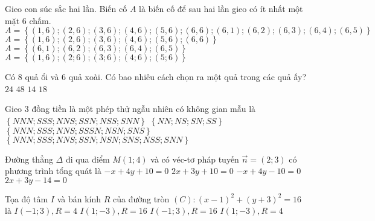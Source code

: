 \begin{ex}%
	Gieo con súc sắc hai lần. Biến cố $A$ là biến cố để sau hai lần gieo có ít nhất một mặt $6$ chấm.
	\choice
	{\True $A=\left\{(1,6);(2,6);(3,6);(4,6);(5,6);(6,6);(6,1);(6,2);(6,3);(6,4);(6,5)\right\}$}
	{$A=\left\{(1,6);(2,6);(3,6);(4,6);(5,6);(6,6)\right\}$}
	{$A=\left\{(6,1);(6,2);(6,3);(6,4);(6,5)\right\}$}
	{$A=\left\{(1,6);(2;6);(3;6);(4;6);(5;6)\right\}$}
\end{ex}

\begin{ex}%
	Có $8$ quả ổi và $6$ quả xoài. Có bao nhiêu cách chọn ra một quả trong các quả ấy?
	\choice
	{$24$}
	{$48$}
	{\True $14$}
	{$18$}
\end{ex}

\begin{ex}%
	Gieo $3$ đồng tiền là một phép thử ngẫu nhiên có không gian mẫu là
	\choice
	{$\left\{NNN; SSS; NNS; SSN; NSS; SNN\right\}$}
	{$\left\{NN; NS ; SN; SS\right\}$}
	{$\left\{NNN; SSS; NNS ;SSSN ;NSN; SNS\right\}$}
	{\True $\left\{NNN; SSS; NNS; SSN; NSN; SNS; NSS; SNN \right\}$}
\end{ex}

\begin{ex}%
	Đường thẳng $\Delta$ đi qua điểm $M(1;4)$ và có véc-tơ pháp tuyến $\overrightarrow{n}=(2;3)$ có phương trình tổng quát là
	\choice
	{$-x+4y+10=0$}
	{$2x+3y + 10=0$}
	{$-x+4y -10 =0$}
	{\True $2x +3y-14=0$}
\end{ex}

\begin{ex}%
	Tọa độ tâm $I$ và bán kính $R$ của đường tròn $(C)\colon (x-1)^2 + (y+3)^2 = 16$ là
	\choice
	{$I\left(-1;3\right), R=4$}
	{$I\left(1;-3\right), R=16$}
	{$I\left(-1;3\right), R=16$}
	{\True $I\left(1;-3\right), R=4$}
\end{ex}

